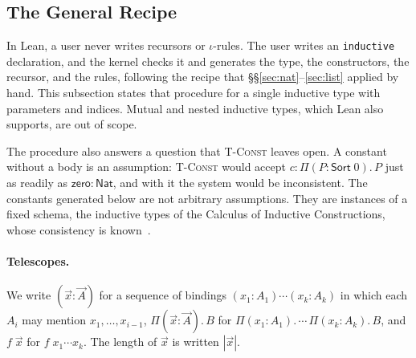 \documentclass[acmsmall,screen,nonacm]{acmart}
\newcommand{\Sort}[1]{\mathsf{Sort}\;#1}
\newcommand{\tPi}[3]{\Pi(#1{:}#2).\,#3}
\newcommand{\Nat}{\mathsf{Nat}}
\newcommand{\zero}{\mathsf{zero}}
\begin{document}
\subsection{The General Recipe}
\label{sec:inductive-decl}

In Lean, a user never writes recursors or $\iota$-rules.
The user writes an \texttt{inductive} declaration, and the kernel checks it and generates the type, the constructors, the recursor, and the rules,
following the recipe that \S\S\ref{sec:nat}--\ref{sec:list} applied by hand.
This subsection states that procedure for a single inductive type with parameters and indices.
Mutual and nested inductive types, which Lean also supports, are out of scope.

The procedure also answers a question that \textsc{T-Const} leaves open.
A constant without a body is an assumption: \textsc{T-Const} would accept $c : \tPi{P}{\Sort{0}}{P}$ just as readily as $\zero : \Nat$, and with it the system would be inconsistent.
The constants generated below are not arbitrary assumptions.
They are instances of a fixed schema, the inductive types of the Calculus of Inductive Constructions, whose consistency is known~\cite{werner1994theorie}.

\paragraph{Telescopes.}
We write $(\vec{x} : \vec{A})$ for a sequence of bindings $(x_1 : A_1) \cdots (x_k : A_k)$ in which each $A_i$ may mention $x_1, \ldots, x_{i-1}$,
$\tPi{\vec{x}}{\vec{A}}{B}$ for $\tPi{x_1}{A_1}{\cdots\,\tPi{x_k}{A_k}{B}}$, and $f\;\vec{x}$ for $f\;x_1 \cdots x_k$.
The length of $\vec{x}$ is written $|\vec{x}|$.
\end{document}
